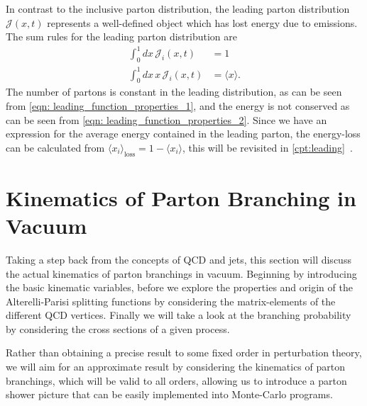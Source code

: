 \documentclass[main.tex]{subfiles}
\begin{document}
In contrast to the inclusive parton distribution, the leading parton distribution \(\mathcal{J}(x,t)\) represents a well-defined object which has lost energy due to emissions. The sum rules for the leading parton distribution are
\begin{align}
    \int_0^1 dx\, \mathcal{J}_i(x,t) &= 1 \label{eqn: leading_function_properties_1}\\
    \int_0^1 dx\, x\,  \mathcal{J}_i(x,t) &= \langle x\rangle.  \label{eqn: leading_function_properties_2}
\end{align}
The number of partons is constant in the leading distribution, as can be seen from \autoref{eqn: leading_function_properties_1}, and the energy is not conserved as can be seen from \autoref{eqn: leading_function_properties_2}. Since we have an expression for the average energy contained in the leading parton, the energy-loss can be calculated from \(\langle x_{i} \rangle_\text{loss} = 1 -\langle x_{i}\rangle \), this will be revisited in \autoref{cpt:leading}~\cite{Neill_2021}. 

\section{Kinematics of Parton Branching in Vacuum}\label{sec: kinematics}
Taking a step back from the concepts of QCD and jets, this section will discuss the actual kinematics of parton branchings in vacuum. Beginning by introducing the basic kinematic variables, before we explore the properties and origin of the Alterelli-Parisi splitting functions by considering the matrix-elements of the different QCD vertices. Finally we will take a look at the branching probability by considering the cross sections of a given process.

Rather than obtaining a precise result to some fixed order in perturbation theory, we will aim for an approximate result by considering the kinematics of parton branchings, which will be valid to all orders, allowing us to introduce a parton shower picture that can be easily implemented into Monte-Carlo programs.
\end{document}
